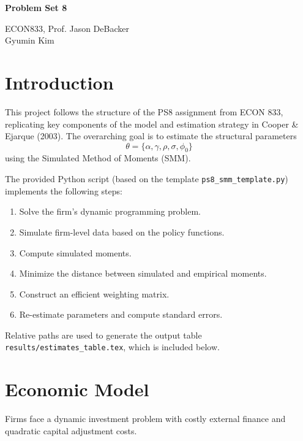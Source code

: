 \documentclass[letterpaper,12pt]{article}
\theoremstyle{definition}
\begin{document}
	
	
	\begin{center}
		\textbf{\large{Problem Set 8}} \\
	\end{center}
	
	\begin{flushleft}
		ECON833, Prof. Jason DeBacker \\
		Gyumin Kim
	\end{flushleft}
	
	\vspace{5mm}

	
	\section{Introduction}
	
	This project follows the structure of the PS8 assignment from ECON 833, 
	replicating key components of the model and estimation strategy in 
	Cooper \& Ejarque (2003).  
	The overarching goal is to estimate the structural parameters 
	\[
	\theta = \{\alpha, \gamma, \rho, \sigma, \phi_0\}
	\]
	using the Simulated Method of Moments (SMM).  
	
	The provided Python script (based on the template \texttt{ps8\_smm\_template.py}) 
	implements the following steps:
	
	\begin{enumerate}
		\item Solve the firm's dynamic programming problem.
		\item Simulate firm-level data based on the policy functions.
		\item Compute simulated moments.
		\item Minimize the distance between simulated and empirical moments.
		\item Construct an efficient weighting matrix.
		\item Re-estimate parameters and compute standard errors.
	\end{enumerate}
	
	Relative paths are used to generate the output table 
	\verb|results/estimates_table.tex|, which is included below.
	
	\section{Economic Model}
	
	Firms face a dynamic investment problem with costly external finance and 
	quadratic capital adjustment costs.  
	
\end{document}
